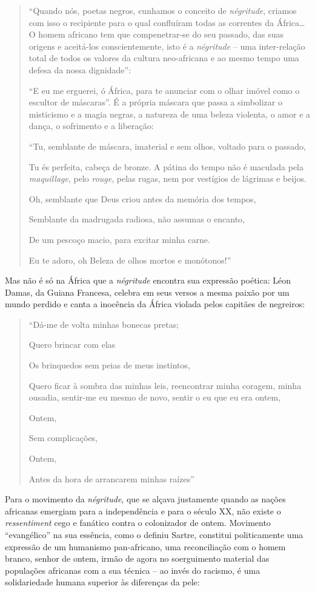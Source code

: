 \documentclass[
  letterpaper,
  DIV=11,
  numbers=noendperiod]{scrreprt}
\begin{document}
\begin{quote}
``Quando nós, poetas negros, cunhamos o conceito de \emph{négritude},
criamos com isso o recipiente para o qual confluíram todas as correntes
da África\ldots{} O homem africano tem que compenetrar-se do seu
passado, das suas origens e aceitá-los conscientemente, isto é a
\emph{négritude} -- uma inter-relação total de todos os valores da
cultura neo-africana e ao mesmo tempo uma defesa da nossa dignidade'':

``E eu me erguerei, ó África, para te anunciar com o olhar imóvel como o
escultor de máscaras''. É a própria máscara que passa a simbolizar o
misticismo e a magia negras, a natureza de uma beleza violenta, o amor e
a dança, o sofrimento e a liberação:

``Tu, semblante de máscara, imaterial e sem olhos, voltado para o
passado,

Tu és perfeita, cabeça de bronze. A pátina do tempo não é maculada pela
\emph{maquillage}, pelo \emph{rouge}, pelas rugas, nem por vestígios de
lágrimas e beijos.

Oh, semblante que Deus criou antes da memória dos tempos,

Semblante da madrugada radiosa, não assumas o encanto,

De um pescoço macio, para excitar minha carne.

Eu te adoro, oh Beleza de olhos mortos e monótonos!''
\end{quote}

Mas não é só na África que a \emph{négritude} encontra sua expressão
poética: Léon Damas, da Guiana Francesa, celebra em seus versos a mesma
paixão por um mundo perdido e canta a inocência da África violada pelos
capitães de negreiros:

\begin{quote}
``Dá-me de volta minhas bonecas pretas;

Quero brincar com elas

Os brinquedos sem peias de meus instintos,

Quero ficar à sombra das minhas leis, reencontrar minha coragem, minha
ousadia, sentir-me eu mesmo de novo, sentir o eu que eu era ontem,

Ontem,

Sem complicações,

Ontem,

Antes da hora de arrancarem minhas raízes''
\end{quote}

Para o movimento da \emph{négritude}, que se alçava justamente quando as
nações africanas emergiam para a independência e para o século XX, não
existe o \emph{ressentiment} cego e fanático contra o colonizador de
ontem. Movimento ``evangélico'' na sua essência, como o definiu Sartre,
constitui politicamente uma expressão de um humanismo pan-africano, uma
reconciliação com o homem branco, senhor de ontem, irmão de agora no
soerguimento material das populações africanas com a sua técnica -- ao
invés do racismo, é uma solidariedade humana superior às diferenças da
pele:
\end{document}
